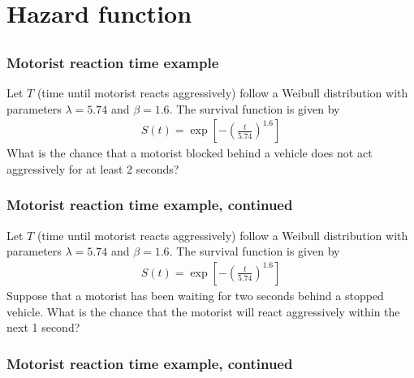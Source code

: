 \section[Hazard function]{Hazard function}
\subsection{}
\begin{frame}
\end{frame}

\begin{frame}
\frametitle{Motorist reaction time example}
Let $T$ (time until motorist reacts aggressively) follow a Weibull distribution with parameters $\lambda=5.74$ and $\beta=1.6$.  The survival function is given by
\begin{eqnarray}
S(t)=\exp\left[ -\left(\frac{t}{5.74} \right)^{1.6} \right] \nonumber
\end{eqnarray}
What is the chance that a motorist blocked behind a vehicle does not act aggressively for at least 2 seconds?
\vskip100pt
\end{frame}

\begin{frame}
\frametitle{Motorist reaction time example, continued}
Let $T$ (time until motorist reacts aggressively) follow a Weibull distribution with parameters $\lambda=5.74$ and $\beta=1.6$.  The survival function is given by
\begin{eqnarray}
S(t)=\exp\left[ -\left(\frac{t}{5.74} \right)^{1.6} \right] \nonumber
\end{eqnarray}
Suppose that a motorist has been waiting for two seconds behind a stopped vehicle. What is the chance that the motorist will react aggressively within the next 1 second?
\vskip100pt
\end{frame}

\begin{frame}
\frametitle{Motorist reaction time example, continued}
\end{frame}

